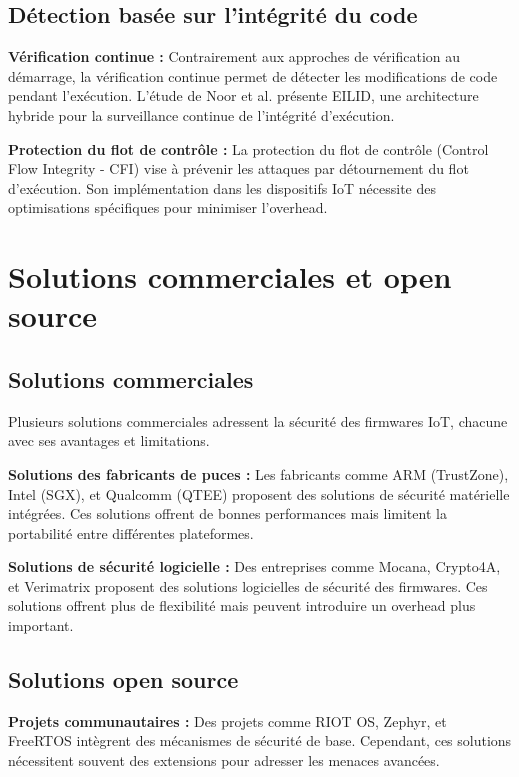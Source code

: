 \subsection{Détection basée sur l'intégrité du code}

\textbf{Vérification continue :} Contrairement aux approches de vérification au démarrage, la vérification continue permet de détecter les modifications de code pendant l'exécution. L'étude de Noor et al. \cite{Noor2025EILID} présente EILID, une architecture hybride pour la surveillance continue de l'intégrité d'exécution.

\textbf{Protection du flot de contrôle :} La protection du flot de contrôle (Control Flow Integrity - CFI) vise à prévenir les attaques par détournement du flot d'exécution. Son implémentation dans les dispositifs IoT nécessite des optimisations spécifiques pour minimiser l'overhead.

\section{Solutions commerciales et open source}

\subsection{Solutions commerciales}

Plusieurs solutions commerciales adressent la sécurité des firmwares IoT, chacune avec ses avantages et limitations.

\textbf{Solutions des fabricants de puces :} Les fabricants comme ARM (TrustZone), Intel (SGX), et Qualcomm (QTEE) proposent des solutions de sécurité matérielle intégrées. Ces solutions offrent de bonnes performances mais limitent la portabilité entre différentes plateformes.

\textbf{Solutions de sécurité logicielle :} Des entreprises comme Mocana, Crypto4A, et Verimatrix proposent des solutions logicielles de sécurité des firmwares. Ces solutions offrent plus de flexibilité mais peuvent introduire un overhead plus important.

\subsection{Solutions open source}

\textbf{Projets communautaires :} Des projets comme RIOT OS, Zephyr, et FreeRTOS intègrent des mécanismes de sécurité de base. Cependant, ces solutions nécessitent souvent des extensions pour adresser les menaces avancées.

